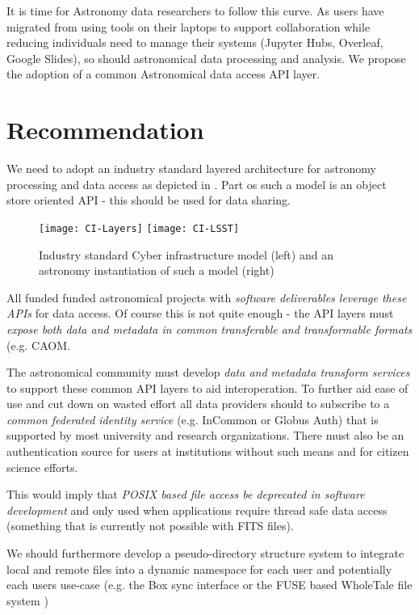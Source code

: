 It is time for Astronomy data researchers to follow this curve. As users have migrated
from using tools on their laptops to support collaboration while reducing
individuals need to manage their systems (Jupyter Hubs, Overleaf, Google Slides),
so should astronomical data processing and analysis. We propose the adoption of
a common Astronomical data access \gls{API} layer.


\section{Recommendation }
We need to adopt an industry  standard layered architecture for astronomy processing and data access as
depicted in . Part os such a model is an object store oriented API - this should be used for data sharing.


\begin{figure}
\centering
\texttt{[image: CI-Layers]}
\texttt{[image: CI-LSST]}
\caption{Industry standard Cyber infrastructure model (left) and an astronomy instantiation of such a model (right)\label{fig:ci}}
\end{figure}

All funded funded astronomical projects with \emph{software deliverables leverage these APIs} for data access.
Of course this is not quite enough - the  \gls{API} layers must \emph{expose both data and \gls{metadata} in common
transferable and transformable formats} (e.g. \gls{CAOM}.

The astronomical community must develop \emph{data and \gls{metadata} transform services}
to support these common \gls{API} layers to aid interoperation. To further aid ease of use and cut down on wasted effort
all data providers should  to subscribe to a
\emph{common federated identity service} (e.g. InCommon or
Globus Auth) that is supported by most university and research organizations. There
must also be
an authentication source for users at institutions without such means and for
citizen science efforts.

This would imply that \emph{POSIX based file access be deprecated
in software development} and only used when applications require thread safe
data access (something that is currently not possible with \gls{FITS} files).

We should furthermore  develop a pseudo-directory structure system to
integrate local and remote files into a dynamic namespace for each user and potentially
each users use-case (e.g. the Box sync interface or the \gls{FUSE} based WholeTale file system
\citep{BRINCKMAN2019854})


